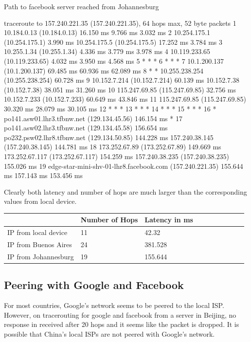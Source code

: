 \documentclass{article}
\begin{document}
Path to facebook server reached from Johannesburg
\begin{code}
traceroute to 157.240.221.35 (157.240.221.35), 64 hops max, 52 byte packets
 1  10.184.0.13 (10.184.0.13)  16.150 ms  9.766 ms  3.032 ms
 2  10.254.175.1 (10.254.175.1)  3.990 ms
    10.254.175.5 (10.254.175.5)  17.252 ms  3.784 ms
 3  10.255.1.34 (10.255.1.34)  4.336 ms  3.779 ms  3.978 ms
 4  10.119.233.65 (10.119.233.65)  4.032 ms  3.950 ms  4.568 ms
 5  * * *
 6  * * *
 7  10.1.200.137 (10.1.200.137)  69.485 ms  60.936 ms  62.089 ms
 8  * * 10.255.238.254 (10.255.238.254)  60.728 ms
 9  10.152.7.214 (10.152.7.214)  60.139 ms
    10.152.7.38 (10.152.7.38)  38.051 ms  31.260 ms
10  115.247.69.85 (115.247.69.85)  32.756 ms
    10.152.7.233 (10.152.7.233)  60.649 ms  43.846 ms
11  115.247.69.85 (115.247.69.85)  30.320 ms  28.079 ms  30.105 ms
12  * * *
13  * * *
14  * * *
15  * * *
16  * po141.asw01.lhr3.tfbnw.net (129.134.45.56)  146.154 ms *
17  po141.asw02.lhr3.tfbnw.net (129.134.45.58)  156.654 ms
    po232.psw02.lhr8.tfbnw.net (129.134.50.85)  144.228 ms
    157.240.38.145 (157.240.38.145)  144.781 ms
18  173.252.67.89 (173.252.67.89)  149.669 ms
    173.252.67.117 (173.252.67.117)  154.259 ms
    157.240.38.235 (157.240.38.235)  155.026 ms
19  edge-star-mini-shv-01-lhr8.facebook.com (157.240.221.35)  155.644 ms  157.143 ms  153.456 ms
\end{code}

Clearly both latency and number of hops are much larger than the corresponding values from local device.

\begin{table}[!ht]
    \centering
    \begin{tabular}{|l|l|l|l|l|l|l|l|l|l|}
    \hline
        ~ &Number of Hops & Latency in ms \\ \hline
        IP from local device & 11 & 42.32  \\ \hline
        IP from Buenos Aires & 24 & 381.528 \\ \hline
        IP from Johannesburg & 19 & 155.644 \\ \hline
        
    \end{tabular}
\end{table}
\subsection*{Peering with Google and Facebook}

For most countries, Google's network seems to be peered to the local ISP. However, on tracerouting for google and facebook from a 
server in Beijing, no response in received after 20 hops and it seems like the packet is dropped. It is possible that China's local 
ISPs are not peered with Google's network.
\end{document}
